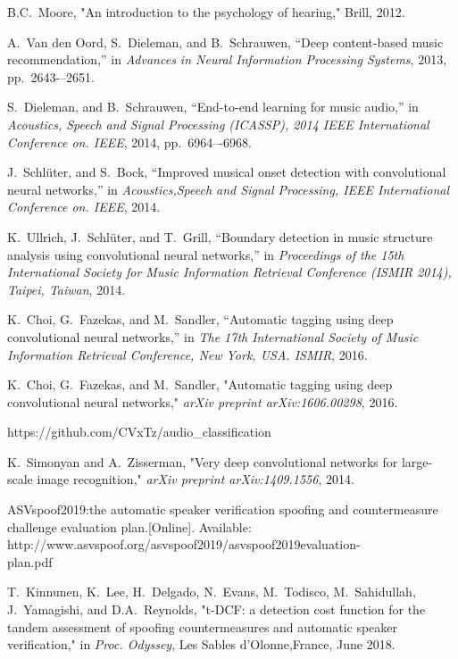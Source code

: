 \documentclass[a4paper]{article}
\begin{document}
\begin{thebibliography}{9}
B.C.\ Moore, "An introduction to the psychology of hearing,"
Brill, 2012.

A.\ Van den Oord, S.\ Dieleman, and B.\ Schrauwen,
“Deep content-based music recommendation,” 
in \textit{Advances in Neural Information Processing Systems}, 2013, pp.~2643-–2651.

S.\ Dieleman, and B.\ Schrauwen, 
“End-to-end learning for music audio,” 
in \textit{Acoustics, Speech and Signal Processing (ICASSP), 2014 IEEE International Conference on. IEEE}, 2014, pp.~6964–-6968.

J.\ Schl\"{u}ter, and S.\ Bock, 
“Improved musical onset detection with convolutional neural networks,” 
in \textit{Acoustics,Speech and Signal Processing, IEEE International Conference on. IEEE}, 2014.

K.\ Ullrich, J.\ Schl\"{u}ter, and T.\ Grill, 
“Boundary detection in music structure analysis using convolutional neural networks,” 
in \textit{Proceedings of the 15th International Society for Music Information Retrieval Conference (ISMIR 2014), Taipei, Taiwan}, 2014.

K.\ Choi, G.\ Fazekas, and M.\ Sandler, 
“Automatic tagging using deep convolutional neural networks,” 
in \textit{The 17th International Society of Music Information Retrieval Conference, New York, USA. ISMIR}, 2016.

K.\ Choi, G.\ Fazekas, and M.\ Sandler,
"Automatic tagging using deep convolutional neural networks,"
\textit{arXiv preprint arXiv:1606.00298}, 2016.

https://github.com/CVxTz/audio\_classification

K.\ Simonyan and A.\ Zisserman,
"Very deep convolutional networks for large-scale image recognition,"
\textit{arXiv preprint arXiv:1409.1556}, 2014.

ASVspoof2019:the automatic speaker verification spoofing and countermeasure challenge evaluation plan.[Online]. Available: http://www.asvspoof.org/asvspoof2019/asvspoof2019evaluation-\\plan.pdf

T.\ Kinnunen,  K.\ Lee,  H.\ Delgado,  N.\ Evans,  M.\ Todisco,  M.\ Sahidullah,  J.\ Yamagishi,  and D.A.\  Reynolds,
"t-DCF:  a  detection  cost  function  for  the  tandem  assessment  of  spoofing countermeasures and automatic speaker verification,"
in \textit{Proc.  Odyssey}, Les Sables d’Olonne,France, June 2018.



\end{thebibliography}
\end{document}
